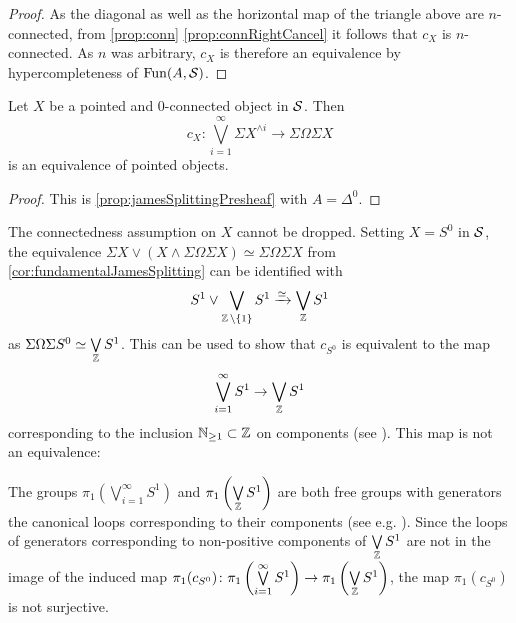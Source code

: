 \begin{prop}
\begin{proof}
        As the diagonal as well as the horizontal map of the triangle above are $n$-connected, from \cref{prop:conn} \ref{prop:connRightCancel} it follows that $c_X$ is $n$-connected. 
        As $n$ was arbitrary, $c_X$ is therefore an equivalence by hypercompleteness of $\operatorname{Fun}(A,\mathcal{S})$.
    \end{proof}
\end{prop}
\begin{corollary}\label{cor:classicalJamesSplitting}
    Let $X$ be a pointed and $0$-connected object in $\mathcal{S}$.
    Then     
    \begin{equation*}
        c_X\colon\bigvee\limits_{i=1}^{\infty}\Sigma X^{\wedge i}\to\Sigma\Omega\Sigma X
    \end{equation*}
    is an equivalence of pointed objects. 
    \begin{proof}
        This is \cref{prop:jamesSplittingPresheaf} with $A=\Delta^0$.
    \end{proof}
\end{corollary}
\begin{remark}
    The connectedness assumption on $X$ cannot be dropped.
    Setting $X=S^0$ in $\mathcal{S}$, the equivalence $\Sigma X\vee (X\wedge \Sigma\Omega\Sigma X)\simeq\Sigma\Omega\Sigma X$ from \cref{cor:fundamentalJamesSplitting} can be identified with
    \begin{equation*}
        S^1\vee \bigvee\limits_{\operatorname{\mathbb{Z}}\setminus\left\lbrace1\right\rbrace}S^1\xrightarrow{\simeq}\bigvee\limits_{\operatorname{\mathbb{Z}}}S^1
    \end{equation*}
    as $\Sigma\Omega\Sigma S^0\simeq\bigvee\limits_{\operatorname{\mathbb{Z}}}S^1$.
    This can be used to show that $c_{S^0}$ is equivalent to the map
    \begin{equation*}
        \bigvee\limits_{i=1}^{\infty} S^1\to\bigvee\limits_{\operatorname{\mathbb{Z}}} S^1
    \end{equation*}
    corresponding to the inclusion $\mathbb{N}_{\geq1}\subset\operatorname{\mathbb{Z}}$ on components (see \cite[Warning 2.13]{splittings_21}).
    This map is not an equivalence:

    The groups $\pi_1\left(\bigvee\limits_{i=1}^{\infty} S^1\right)$ and $\pi_1\left(\bigvee\limits_{\operatorname{\mathbb{Z}}} S^1\right)$ are both free groups with generators the canonical loops corresponding to their components (see e.g. \cite[Proposition 1A.2]{hatcher2002algebraic}).
    Since the loops of generators corresponding to non-positive components of $\bigvee\limits_{\operatorname{\mathbb{Z}}} S^1$ are not in the image of the induced map $\pi_1(c_{S^0})\colon\pi_1\left(\bigvee\limits_{i=1}^{\infty} S^1\right)\to\pi_1\left(\bigvee\limits_{\operatorname{\mathbb{Z}}} S^1\right)$, the map $\pi_1(c_{S^0})$ is not surjective.
\end{remark}
